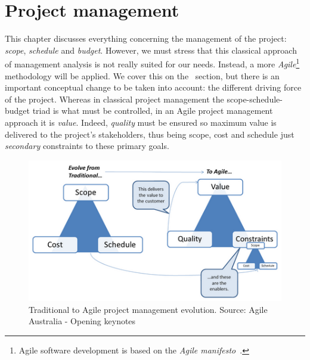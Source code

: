 \chapter{Project management} %
\label{Chapter5ProjectManagement} %


This chapter discusses everything concerning the management of the project: \textit{scope}, \textit{schedule} and \textit{budget}. However, we must stress that this classical approach of management analysis is not really suited for our needs. Instead, a more \textit{Agile}\footnote{Agile software development is based on the \textit{Agile manifesto}~\cite{web:AgileManifesto}.} methodology will be applied. We cover this on the~ section, but there is an important conceptual change to be taken into account: the different driving force of the project. Whereas in classical project management the scope-schedule-budget triad is what must be controlled, in an Agile project management approach it is \textit{value}. Indeed, \textit{quality} must be ensured so maximum value is delivered to the project's stakeholders, thus being scope, cost and schedule just \textit{secondary} constraints to these primary goals.

\begin{figure}[h]
	\centering
	\includegraphics[width=0.7\linewidth]{figures/agile-triangle.png}
	\caption{Traditional to Agile project management evolution. Source: Agile Australia - Opening keynotes~\citep{web:AgileTriangle}}
	\label{fig:agile-pm}
\end{figure}




